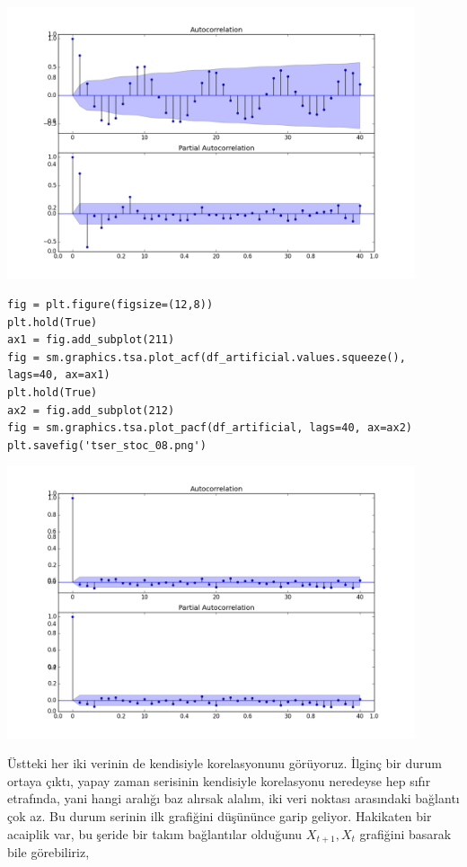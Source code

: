 \documentclass[12pt,fleqn]{article}\usepackage{../../common}
\begin{document}
\includegraphics[height=8cm]{tser_stoc_07.png}

\begin{verbatim}
fig = plt.figure(figsize=(12,8))
plt.hold(True)
ax1 = fig.add_subplot(211)
fig = sm.graphics.tsa.plot_acf(df_artificial.values.squeeze(), lags=40, ax=ax1)
plt.hold(True)
ax2 = fig.add_subplot(212)
fig = sm.graphics.tsa.plot_pacf(df_artificial, lags=40, ax=ax2)
plt.savefig('tser_stoc_08.png')
\end{verbatim}

\includegraphics[height=8cm]{tser_stoc_08.png}

Üstteki her iki verinin de kendisiyle korelasyonunu görüyoruz. İlginç bir durum
ortaya çıktı, yapay zaman serisinin kendisiyle korelasyonu neredeyse hep sıfır
etrafında, yani hangi aralığı baz alırsak alalım, iki veri noktası arasındaki
bağlantı çok az. Bu durum serinin ilk grafiğini düşününce garip
geliyor. Hakikaten bir acaiplik var, bu şeride bir takım bağlantılar olduğunu
$X_{t+1},X_t$ grafiğini basarak bile görebiliriz,
\end{document}
